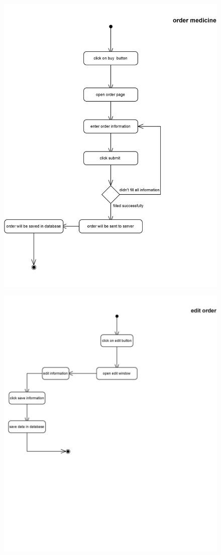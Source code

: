 \documentclass[]{article}
\begin{document}
\begin{figure}[H]
\centering
\includegraphics[scale=0.6]{./activity/08}
\end{figure}
\begin{figure}[H]
\centering
\includegraphics[scale=0.6]{./activity/09}
\end{figure}
\end{document}
